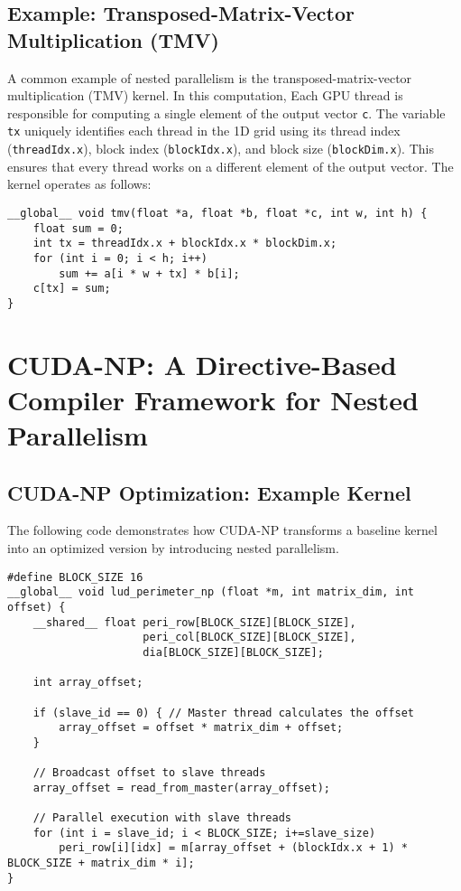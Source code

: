 \documentclass{report}
\begin{document}
\subsection{Example: Transposed-Matrix-Vector Multiplication (TMV)}
A common example of nested parallelism is the transposed-matrix-vector multiplication (TMV) kernel. In this computation, Each GPU thread is responsible for computing a single element of the output vector \texttt{c}. The variable \texttt{tx} uniquely identifies each thread in the 1D grid using its thread index (\texttt{threadIdx.x}), block index (\texttt{blockIdx.x}), and block size (\texttt{blockDim.x}). This ensures that every thread works on a different element of the output vector. The kernel operates as follows:

\begin{lstlisting}[style=cuda, caption={Transposed-Matrix-Vector Multiplication (TMV) Kernel}, label={lst:tmv_kernel}]
__global__ void tmv(float *a, float *b, float *c, int w, int h) {
    float sum = 0;
    int tx = threadIdx.x + blockIdx.x * blockDim.x;
    for (int i = 0; i < h; i++)
        sum += a[i * w + tx] * b[i];
    c[tx] = sum;
}
\end{lstlisting}


\section{CUDA-NP: A Directive-Based Compiler Framework for Nested Parallelism}

\subsection{CUDA-NP Optimization: Example Kernel}
The following code demonstrates how CUDA-NP transforms a baseline kernel into an optimized version by introducing nested parallelism.

\begin{lstlisting}[style=cuda, caption={Optimized Kernel Using CUDA-NP}, label={lst:optimized_kernel}]
#define BLOCK_SIZE 16
__global__ void lud_perimeter_np (float *m, int matrix_dim, int offset) {
    __shared__ float peri_row[BLOCK_SIZE][BLOCK_SIZE],
                     peri_col[BLOCK_SIZE][BLOCK_SIZE],
                     dia[BLOCK_SIZE][BLOCK_SIZE];

    int array_offset;
    
    if (slave_id == 0) { // Master thread calculates the offset
        array_offset = offset * matrix_dim + offset;
    }

    // Broadcast offset to slave threads
    array_offset = read_from_master(array_offset);

    // Parallel execution with slave threads
    for (int i = slave_id; i < BLOCK_SIZE; i+=slave_size)
        peri_row[i][idx] = m[array_offset + (blockIdx.x + 1) * BLOCK_SIZE + matrix_dim * i];
}
\end{lstlisting}
\end{document}
